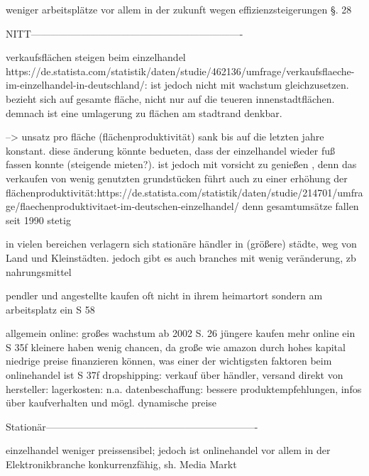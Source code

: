         weniger arbeitsplätze vor allem in der zukunft wegen effizienzsteigerungen \S. 28
        
        
        NITT----------------------------------------------------------------
        
        verkaufsflächen steigen beim einzelhandel https://de.statista.com/statistik/daten/studie/462136/umfrage/verkaufsflaeche-im-einzelhandel-in-deutschland/: ist jedoch nicht mit wachstum gleichzusetzen. bezieht sich auf gesamte fläche, nicht nur auf die teueren innenstadtflächen. demnach ist eine umlagerung zu flächen am stadtrand denkbar.
        
        --> unsatz pro fläche (flächenproduktivität) sank bis auf die letzten jahre konstant. diese änderung könnte bedueten, dass der einzelhandel wieder fuß fassen konnte (steigende mieten?). ist jedoch mit vorsicht zu genießen , denn das verkaufen von wenig genutzten grundstücken führt auch zu einer erhöhung der flächenproduktivität:https://de.statista.com/statistik/daten/studie/214701/umfrage/flaechenproduktivitaet-im-deutschen-einzelhandel/
        denn gesamtumsätze fallen seit 1990 stetig \cite[S. 6]{Nitt}
        
        in vielen bereichen verlagern sich stationäre händler in (größere) städte, weg von Land und Kleinstädten. jedoch gibt es auch branches mit wenig veränderung, zb nahrungsmittel
        
        pendler und angestellte kaufen oft nicht in ihrem heimartort sondern am arbeitsplatz ein S 58
    
    
    
    
    
    
        
        allgemein online: großes wachstum ab 2002 S. 26
            jüngere kaufen mehr online ein S 35f
            kleinere haben wenig chancen, da große wie amazon durch hohes kapital niedrige preise finanzieren können, was einer der wichtigsten faktoren beim onlinehandel ist S 37f
            dropshipping: verkauf über händler, versand direkt von hersteller: lagerkosten: n.a.
            datenbeschaffung: bessere produktempfehlungen, infos über kaufverhalten und mögl. dynamische preise
            
    
        
        Stationär----------------------------------------------------------------


            einzelhandel weniger preissensibel; jedoch ist onlinehandel vor allem in der Elektronikbranche konkurrenzfähig, sh. Media Markt \cite[S. 21f]{Graf}

